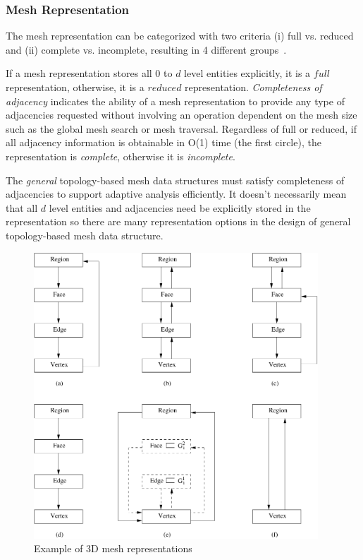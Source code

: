 \subsubsection{Mesh Representation}\label{ch:meshrep}
The mesh representation can be categorized with two criteria (i) full vs. reduced and (ii) complete vs. incomplete, resulting in 4 different groups~\cite{seolthesis}. 

If a mesh representation stores all $0$ to $d$ level entities explicitly, it is a $full$ representation, otherwise, it is a $reduced$ representation. \emph{Completeness of adjacency} indicates the ability of a mesh representation
to provide any type of adjacencies requested without involving an
operation dependent on the mesh size such as the global mesh search or mesh traversal.
Regardless of full or reduced, if all adjacency information is obtainable in
O(1) time (the first circle), the representation is \emph{complete}, otherwise it is \emph{incomplete}. 

The \emph{general} topology-based mesh data structures must satisfy completeness of adjacencies to support adaptive
analysis efficiently. It doesn't necessarily mean that all $d$ level entities and adjacencies need be explicitly stored in the representation so there are many representation options in the design of general topology-based mesh data structure. 
\begin{figure}
\centering
\includegraphics[width=4.2in]{./fig/6complete}
\caption{Example of 3D mesh representations}
\label{fig:6completeMR}  
\end{figure}

